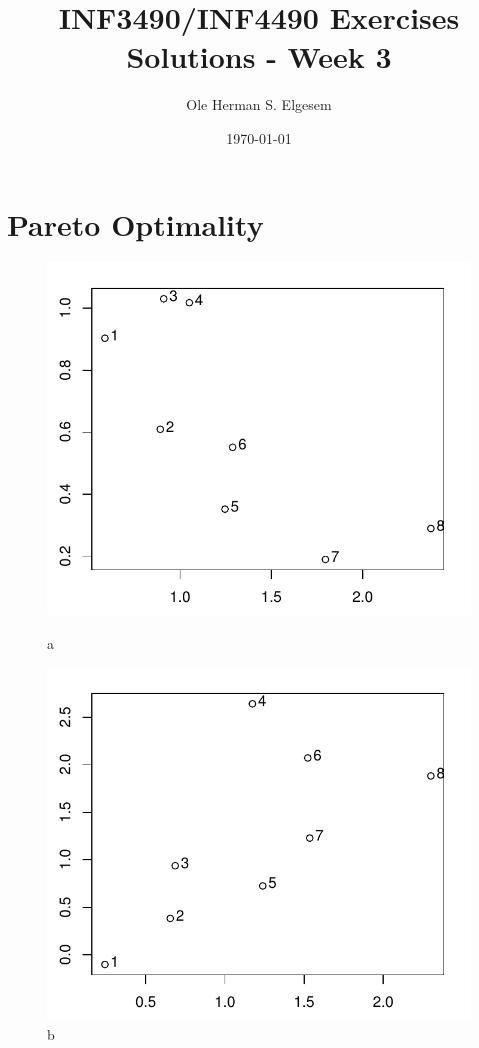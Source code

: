 \documentclass{article}           %
\title{\vspace{-2cm}INF3490/INF4490 Exercises Solutions - Week 3}
\author{Ole Herman S. Elgesem}
\date{\today}
\newcommand\marginsymbol[1][0pt]{%
  \tabto*{0cm}\makebox[\dimexpr-1cm-#1\relax][r]{$\mathbb{P}$}\tabto*{\TabPrevPos}}
\begin{document}
    \renewcommand\marginsymbol[1][0pt]{%
  \tabto*{0cm}\makebox[-1cm][c]{$\mathbb{P}$}\tabto*{\TabPrevPos}}

\maketitle


\section{Pareto Optimality}
\begin{figure}[H]
  \centering
  \begin{minipage}[b]{0.45\textwidth}
    \includegraphics[width=\textwidth]{front_points_1.pdf}
    \caption{a}
  \end{minipage}
  \hfill
  \begin{minipage}[b]{0.45\textwidth}
    \includegraphics[width=\textwidth]{front_points_2.pdf}
    \caption{b}
  \end{minipage}
\end{figure}
\end{document}
